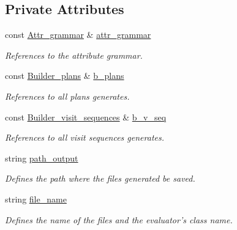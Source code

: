\subsection*{Private Attributes}
\begin{DoxyCompactItemize}
\item 
const \hyperlink{classgenevalmag_1_1Attr__grammar}{Attr\_\-grammar} \& \hyperlink{classgenevalmag_1_1Builder__code_a94e3c41b0c77596acfb34c731c17f001}{attr\_\-grammar}
\begin{DoxyCompactList}\small\item\em References to the attribute grammar. \item\end{DoxyCompactList}\item 
const \hyperlink{classgenevalmag_1_1Builder__plans}{Builder\_\-plans} \& \hyperlink{classgenevalmag_1_1Builder__code_aba5b99353b3ec17c3b788c7baa2ae4ce}{b\_\-plans}
\begin{DoxyCompactList}\small\item\em References to all plans generates. \item\end{DoxyCompactList}\item 
const \hyperlink{classgenevalmag_1_1Builder__visit__sequences}{Builder\_\-visit\_\-sequences} \& \hyperlink{classgenevalmag_1_1Builder__code_a4440af64f703eb71fd4df162f39fdcc6}{b\_\-v\_\-seq}
\begin{DoxyCompactList}\small\item\em References to all visit sequences generates. \item\end{DoxyCompactList}\item 
string \hyperlink{classgenevalmag_1_1Builder__code_a7e921a42176e2397ec0a34308408ab4c}{path\_\-output}
\begin{DoxyCompactList}\small\item\em Defines the path where the files generated be saved. \item\end{DoxyCompactList}\item 
string \hyperlink{classgenevalmag_1_1Builder__code_aba028c9ecb9918cd3371b2838b70a639}{file\_\-name}
\begin{DoxyCompactList}\small\item\em Defines the name of the files and the evaluator's class name. \item\end{DoxyCompactList}\end{DoxyCompactItemize}


